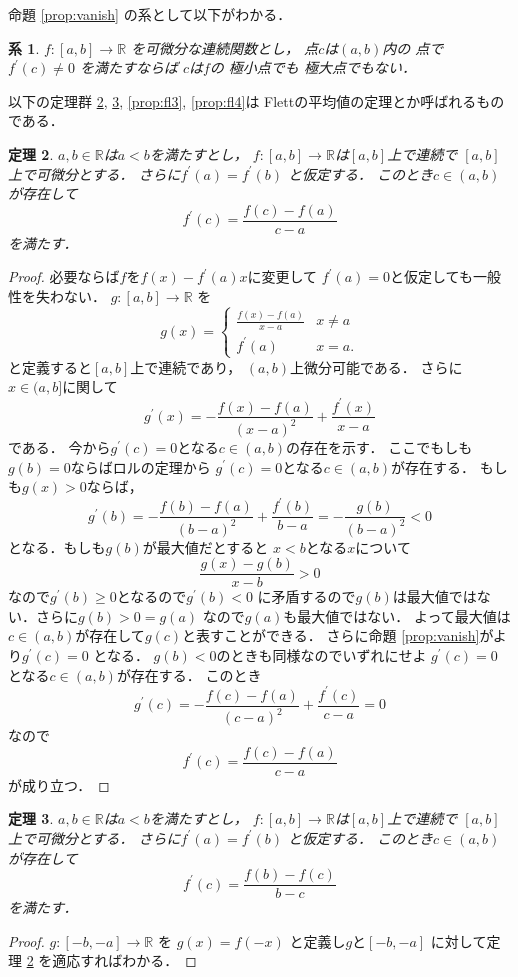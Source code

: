 \documentclass[leqno, a4paper, 12pt]{jsarticle}
\newtheorem{thm}{定理}
\newtheorem{cor}[thm]{系}
\newcommand{\rr}{\mathbb{R}}
\newcommand{\bibun}[1]{#1^{\prime}}
\begin{document}
命題 \ref{prop:vanish}
の系として以下がわかる．
\begin{cor}
$f: [a, b]\to \rr$
を可微分な連続関数とし，
点$c$は$(a, b)$内の
点で
$\bibun{f}(c)\neq 0$
を満たすならば
$c$は$f$の
極小点でも
極大点でもない．
\end{cor}





以下の定理群 \ref{thm:fl}, \ref{thm:fl2}, 
\ref{prop:fl3}, \ref{prop:fl4}は
Flettの平均値の定理とか呼ばれるものである．
\begin{thm}\label{thm:fl}
$a, b\in \rr$は$a<b$を満たすとし，
$f: [a, b]\to \rr$は$[a, b]$上で連続で
$[a, b]$上で可微分とする．
さらに$\bibun{f}(a)=\bibun{f}(b)$
と仮定する．
このとき$c\in (a, b)$が存在して
\[
\bibun{f}(c)=\frac{f(c)-f(a)}{c-a}
\]
を満たす．
\end{thm}
\begin{proof}
必要ならば$f$を$f(x)-\bibun{f}(a)x$に変更して
$\bibun{f}(a)=0$と仮定しても一般性を失わない．
$g: [a, b]\to \rr$
を
\[
g(x)
=
\begin{cases}
\displaystyle \frac{f(x)-f(a)}{x-a} & \text{$x\neq a$}\\
\bibun{f}(a) & \text{$x=a$.}
\end{cases}
\]
と定義すると$[a, b]$上で連続であり，
$(a, b)$上微分可能である．
さらに$x\in (a, b]$に関して
\[
\bibun{g}(x)=
-\frac{f(x)-f(a)}{(x-a)^2}+\frac{\bibun{f}(x)}{x-a}
\]
である．
今から$\bibun{g}(c)=0$となる$c\in (a, b)$の存在を示す．
ここでもしも$g(b)=0$ならばロルの定理から
$\bibun{g}(c)=0$となる$c\in (a, b)$が存在する．
もしも$g(x)>0$ならば，
\[
\bibun{g}(b)=
-\frac{f(b)-f(a)}{(b-a)^2}+\frac{\bibun{f}(b)}{b-a}
=-\frac{g(b)}{(b-a)^2}<0
\]
となる．もしも$g(b)$が最大値だとすると
$x<b$となる$x$について
\[
\frac{g(x)-g(b)}{x-b}>0
\]
なので$\bibun{g}(b)\ge 0$となるので$\bibun{g}(b)<0$
に矛盾するので$g(b)$は最大値ではない．さらに$g(b)>0=g(a)$
なので$g(a)$も最大値ではない．
よって最大値は$c\in (a, b)$が存在して$g(c)$と表すことができる．
さらに命題 \ref{prop:vanish}がより$\bibun{g}(c)=0$
となる．
$g(b)<0$のときも同様なのでいずれにせよ
$\bibun{g}(c)=0$
となる$c\in (a, b)$が存在する．
このとき
\[
\bibun{g}(c)=
-\frac{f(c)-f(a)}{(c-a)^2}+\frac{\bibun{f}(c)}{c-a}=0
\]
なので
\[
\bibun{f}(c)=\frac{f(c)-f(a)}{c-a}
\]
が成り立つ．
\end{proof}


\begin{thm}\label{thm:fl2}
$a, b\in \rr$は$a<b$を満たすとし，
$f: [a, b]\to \rr$は$[a, b]$上で連続で
$[a, b]$上で可微分とする．
さらに$\bibun{f}(a)=\bibun{f}(b)$
と仮定する．
このとき$c\in (a, b)$が存在して
\[
\bibun{f}(c)=\frac{f(b)-f(c)}{b-c}
\]
を満たす．
\end{thm}
\begin{proof}
$g: [-b, -a]\to \rr$
を
$g(x)=f(-x)$
と定義し$g$と$[-b, -a]$
に対して定理 \ref{thm:fl}
を適応すればわかる．
\end{proof}
\end{document}

